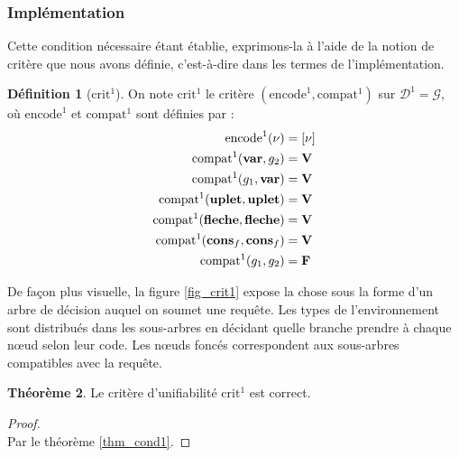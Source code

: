 \documentclass[a4paper]{report}
\newenvironment{preuve} 
  {\begin{proof}~\\} 
  {\end{proof}}
\theoremstyle{definition}
\newtheorem{theoreme}{Théorème}
\newtheorem{definition}[theoreme]{Définition}
\newcommand{\G}{\mathscr{G}}
\begin{document}
\subsubsection{Implémentation}

Cette condition nécessaire étant établie, exprimons-la à l'aide de la notion de critère que nous avons définie, c'est-à-dire dans les termes de l'implémentation.

\begin{definition}[$\mathrm{crit}^1$]
  On note $\mathrm{crit}^1$ le critère $(\mathrm{encode}^1, \mathrm{compat}^1)$ sur $\mathscr{D}^1 = \G$, où $\mathrm{encode}^1$ et $\mathrm{compat}^1$ sont définies par :
  \begin{align*}
      \mathrm{encode}^1 (\nu) &=
      [ \nu ]
    \\
      \mathrm{compat}^1 (\bold{var}, {g}_2) &=
      \bold{V}
    \\
      \mathrm{compat}^1 ({g}_1, \bold{var}) &=
      \bold{V}
    \\
      \mathrm{compat}^1 (\bold{uplet}, \bold{uplet}) &=
      \bold{V}
    \\
      \mathrm{compat}^1 (\bold{fleche}, \bold{fleche}) &=
      \bold{V}
    \\
      \mathrm{compat}^1 (\bold{cons}_f, \bold{cons}_f) &=
      \bold{V}
    \\
      \mathrm{compat}^1 ({g}_1, {g}_2) &=
      \bold{F}
  \end{align*}
\end{definition}

De façon plus visuelle, la figure \ref{fig_crit1} expose la chose sous la forme d'un arbre de décision auquel on soumet une requête. Les types de l'environnement sont distribués dans les sous-arbres en décidant quelle branche prendre à chaque nœud selon leur code. Les nœuds foncés correspondent aux sous-arbres compatibles avec la requête.

\begin{theoreme} \label{thm_crit1}
  Le critère d'unifiabilité $\mathrm{crit}^1$ est correct.
\end{theoreme}

\begin{preuve}
  Par le théorème \ref{thm_cond1}.
\end{preuve}
\end{document}
